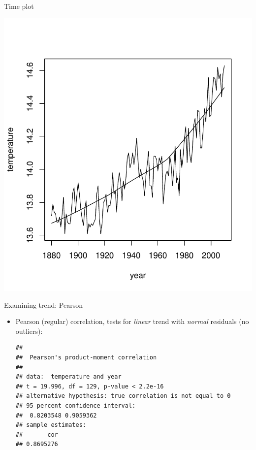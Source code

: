 \begin{frame}[fragile]{Time plot}
  
\begin{knitrout}
\color{fgcolor}
\includegraphics[width=\maxwidth]{figure/kahdkjheoiu-1} 

\end{knitrout}
  
\end{frame}


\begin{frame}[fragile]{Examining trend: Pearson}
  
  \begin{itemize}
  \item Pearson (regular) correlation, tests for \emph{linear} trend
    with \emph{normal} residuals (no outliers):
{\small
\begin{knitrout}
\color{fgcolor}\begin{kframe}
\begin{alltt}
\end{alltt}
\begin{verbatim}
## 
## 	Pearson's product-moment correlation
## 
## data:  temperature and year
## t = 19.996, df = 129, p-value < 2.2e-16
## alternative hypothesis: true correlation is not equal to 0
## 95 percent confidence interval:
##  0.8203548 0.9059362
## sample estimates:
##       cor 
## 0.8695276
\end{verbatim}
\end{kframe}
\end{knitrout}
}
  \end{itemize}
  
\end{frame}

